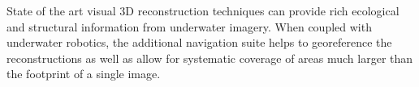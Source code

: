State of the art visual 3D reconstruction techniques can provide rich ecological and structural information from underwater imagery. When coupled with underwater robotics, the additional navigation suite helps to georeference the reconstructions as well as allow for systematic coverage of areas much larger than the footprint of a single image.